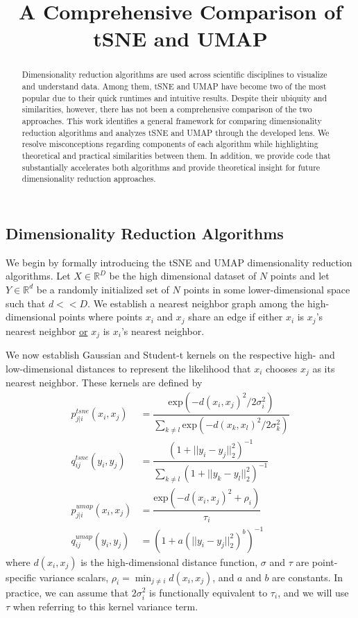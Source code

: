 \documentclass{article}
\title{A Comprehensive Comparison of tSNE and UMAP}
\theoremstyle{definition}
\begin{document}
\maketitle

\begin{multicols}{2}

\begin{abstract}
Dimensionality reduction algorithms are used across scientific disciplines to visualize and understand data. Among them, tSNE and UMAP have become two of the most
popular due to their quick runtimes and intuitive results. Despite their ubiquity and similarities, however, there
has not been a comprehensive comparison of the two approaches. This work identifies a general framework for comparing dimensionality reduction algorithms and
analyzes tSNE and UMAP through the developed lens. We resolve misconceptions regarding components of each algorithm while highlighting theoretical and practical
similarities between them. In addition, we provide code that substantially accelerates both algorithms and provide theoretical insight for future
dimensionality reduction approaches.
\end{abstract}

\section{Dimensionality Reduction Algorithms}
We begin by formally introducing the tSNE and UMAP dimensionality reduction algorithms. Let $X \in \mathbb{R}^D$ be the high dimensional dataset of $N$ points and let $Y
\in \mathbb{R}^d$ be a randomly initialized set of $N$ points in some lower-dimensional space such that $d << D$. We establish a nearest neighbor graph among the
high-dimensional points where points $x_i$ and $x_j$ share an edge if either $x_i$ is $x_j$'s nearest neighbor \underline{or} $x_j$ is $x_i$'s nearest neighbor.

We now establish Gaussian and Student-t kernels on the respective high- and low-dimensional distances to represent the likelihood that $x_i$ chooses $x_j$ as
its nearest neighbor. These kernels are defined by
\begin{align}
    p^{tsne}_{j|i}(x_i, x_j) &= \dfrac{\text{exp}(-d(x_i, x_j)^2 / 2 \sigma_i^2)}{\sum_{k \neq l} \text{exp}(-d(x_k, x_l)^2 / 2 \sigma_k^2)} \\[0.5ex]
    q^{tsne}_{ij}(y_i, y_j) &= \dfrac{(1 + ||y_i - y_j||^2_2)^{-1}}{\sum_{k \neq l} (1 + ||y_k - y_l||^2_2)^{-1}} \\[1.5ex]
    p^{umap}_{j|i}(x_i, x_j) &= \dfrac{\text{exp} (-d(x_i, x_j)^2 + \rho_{i})}{\tau_i} \\[0.3ex]
    q^{umap}_{ij}(y_i, y_j) &= \left( 1 + a(||y_i - y_j||^2_2)^b \right) ^{-1}
\end{align}
where $d(x_i, x_j)$ is the high-dimensional distance function, $\sigma$ and $\tau$ are point-specific variance scalars, $\rho_i = \min_{j \neq i} d(x_i, x_j)$,
and $a$ and $b$ are constants. In practice, we can assume that $2 \sigma_i^2$ is functionally equivalent to $\tau_i$, and we will use $\tau$ when referring to
this kernel variance term.


\end{multicols}
\end{document}
